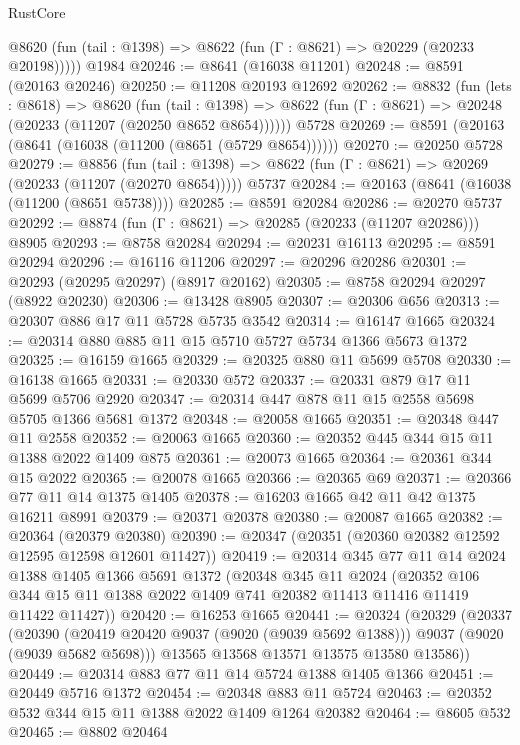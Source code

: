 \begin{lexlean}{RustCore}
\begin{coremodule}
      @8620 (fun (tail : @1398) => @8622 (fun (Γ : @8621) => @20229 (@20233 @20198)))))
    @1984
@20246 := @8641 (@16038 @11201)
@20248 := @8591 (@20163 @20246)
@20250 := @11208 @20193 @12692
@20262 := @8832
    (fun (lets : @8618) =>
    @8620
      (fun (tail : @1398) =>
      @8622 (fun (Γ : @8621) => @20248 (@20233 (@11207 (@20250 @8652 @8654))))))
    @5728
@20269 := @8591 (@20163 (@8641 (@16038 (@11200 (@8651 (@5729 @8654))))))
@20270 := @20250 @5728
@20279 := @8856
    (fun (tail : @1398) => @8622 (fun (Γ : @8621) => @20269 (@20233 (@11207 (@20270 @8654)))))
    @5737
@20284 := @20163 (@8641 (@16038 (@11200 (@8651 @5738))))
@20285 := @8591 @20284
@20286 := @20270 @5737
@20292 := @8874 (fun (Γ : @8621) => @20285 (@20233 (@11207 @20286))) @8905
@20293 := @8758 @20284
@20294 := @20231 @16113
@20295 := @8591 @20294
@20296 := @16116 @11206
@20297 := @20296 @20286
@20301 := @20293 (@20295 @20297) (@8917 @20162)
@20305 := @8758 @20294 @20297 (@8922 @20230)
@20306 := @13428 @8905
@20307 := @20306 @656
@20313 := @20307 @886 @17 @11 @5728 @5735 @3542
@20314 := @16147 @1665
@20324 := @20314 @880 @885 @11 @15 @5710 @5727 @5734 @1366 @5673 @1372
@20325 := @16159 @1665
@20329 := @20325 @880 @11 @5699 @5708
@20330 := @16138 @1665
@20331 := @20330 @572
@20337 := @20331 @879 @17 @11 @5699 @5706 @2920
@20347 := @20314 @447 @878 @11 @15 @2558 @5698 @5705 @1366 @5681 @1372
@20348 := @20058 @1665
@20351 := @20348 @447 @11 @2558
@20352 := @20063 @1665
@20360 := @20352 @445 @344 @15 @11 @1388 @2022 @1409 @875
@20361 := @20073 @1665
@20364 := @20361 @344 @15 @2022
@20365 := @20078 @1665
@20366 := @20365 @69
@20371 := @20366 @77 @11 @14 @1375 @1405
@20378 := @16203 @1665 @42 @11 @42 @1375 @16211 @8991
@20379 := @20371 @20378
@20380 := @20087 @1665
@20382 := @20364 (@20379 @20380)
@20390 := @20347 (@20351 (@20360 @20382 @12592 @12595 @12598 @12601 @11427))
@20419 := @20314
    @345
    @77
    @11
    @14
    @2024
    @1388
    @1405
    @1366
    @5691
    @1372
    (@20348
      @345
      @11
      @2024
      (@20352 @106 @344 @15 @11 @1388 @2022 @1409 @741 @20382 @11413 @11416 @11419 @11422 @11427))
@20420 := @16253 @1665
@20441 := @20324
    (@20329
      (@20337
        (@20390 (@20419 @20420 @9037 (@9020 (@9039 @5692 @1388))) @9037 (@9020 (@9039 @5682 @5698)))
        @13565
        @13568
        @13571
        @13575
        @13580
        @13586))
@20449 := @20314 @883 @77 @11 @14 @5724 @1388 @1405 @1366
@20451 := @20449 @5716 @1372
@20454 := @20348 @883 @11 @5724
@20463 := @20352 @532 @344 @15 @11 @1388 @2022 @1409 @1264 @20382
@20464 := @8605 @532
@20465 := @8802 @20464

\end{coremodule}
\end{lexlean}

